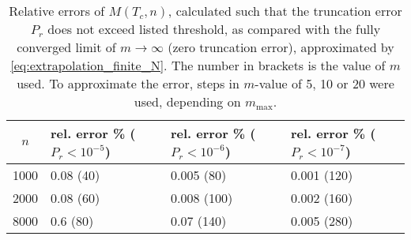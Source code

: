 \begin{table}[]
\centering
\begin{tabularx}{\linewidth}{cXXX}
$n$ & rel. error \% ($ P_r < 10^{-5} $)  & rel. error \% ($P_r < 10^{-6}$) & rel. error \% ($P_r < 10^{-7}$) \\ \midrule
1000  & 0.08 (40)                         & 0.005 (80)    & 0.001 (120)                               \\
2000  & 0.08 (60)                         & 0.008 (100)   & 0.002 (160)                             \\
8000  & 0.6  (80)                         & 0.07  (140)   & 0.005 (280)                              \\ \bottomrule
\end{tabularx}
\caption{Relative errors of $M(T_c, n)$, calculated such that the truncation error $P_r$ does not exceed listed threshold,
as compared with the fully converged limit of $m \to \infty$ (zero truncation error),
approximated by \autoref{eq:extrapolation_finite_N}. The number in brackets is the value of $m$ used. To approximate the error, steps in $m$-value of 5, 10 or 20 were used, depending on $m_{\text{max}}$.} \label{table:rel_error_order_param_finite_N_T_crit}
\end{table}
